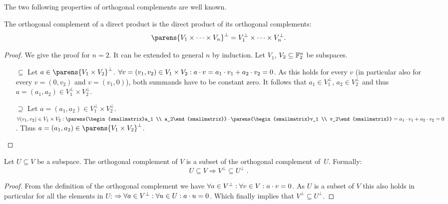The two following properties of orthogonal complements are well known.
\begin{lemma}
    The orthogonal complement of a direct product is the direct product of its orthogonal complements:
    \begin{equation*}
        \parens{V_1 \times \cdots \times V_n}^\perp = V_1^\perp \times \cdots \times V_n^\perp.
    \end{equation*}
\end{lemma}
\begin{proof}
    We give the proof for $n = 2$.
    It can be extended to general $n$ by induction.
    Let $V_1$, $V_2 \subseteq \mathbb{F}_2^n$ be subspaces.
    \begin{itemize}
        \item[$\subseteq$]
            Let $a \in \parens{V_1 \times V_2}^\perp$.
            $\forall v = (v_1, v_2) \in V_1 \times V_2 : a \cdot v = a_1 \cdot v_1 + a_2 \cdot v_2 = 0$.
            As this holds for every $v$ (in particular also for every $v = (0, v_2)$ and $v = (v_1, 0)$), both summands have to be constant zero.
            It follows that $a_1 \in V_1^\perp$, $a_2 \in V_2^\perp$ and thus $a = (a_1, a_2) \in V_1^\perp \times V_2^\perp$.
        \item[$\supseteq$]
            Let $a = (a_1, a_2) \in V_1^\perp \times V_2^\perp$.
            $\forall (v_1, v_2) \in V_1 \times V_2 : \iprod{\parens{\begin{smallmatrix}a_1 \\ a_2\end{smallmatrix}}}{\parens{\begin{smallmatrix}v_1 \\ v_2\end{smallmatrix}}} = \iprod{a_1}{v_1} + \iprod{a_2}{v_2} = 0$.
            Thus $a = (a_1, a_2) \in \parens{V_1 \times V_2}^\perp$.
    \end{itemize}
\end{proof}

\begin{lemma}\label{st:lem:subset_complements}
    Let $U \subseteq V$ be a subspace.
    The orthogonal complement of $V$ is a subset of the orthogonal complement of~$U$.
    Formally:
    \begin{equation*}
        U \subseteq V \Rightarrow V^\perp \subseteq U^\perp\;.
    \end{equation*}
\end{lemma}
\begin{proof}
    From the definition of the orthogonal complement we have $\forall a \in V^\perp : \forall v \in V : a \cdot v = 0$.
    As $U$ is a subset of $V$ this also holds in particular for all the elements in $U$: $\Rightarrow \forall a \in V^\perp : \forall u \in U : a \cdot u = 0$.
    Which finally implies that $V^\perp \subseteq U^\perp$.
\end{proof}

